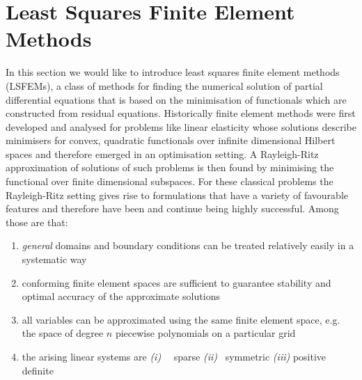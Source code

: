 \documentclass[../draft_1.tex]{subfiles}
\begin{document}
\section{Least Squares Finite Element Methods}

In this section 
we would like to introduce least squares finite element methods (LSFEMs), a class of methods for finding the numerical solution of partial differential equations that is based on the minimisation of functionals which are constructed from residual equations. Historically finite element methods were first developed and analysed for problems like linear elasticity whose solutions describe minimisers for convex, quadratic functionals over infinite dimensional Hilbert spaces and therefore emerged in an optimisation setting. A Rayleigh-Ritz approximation of solutions of such problems is then found by minimising the functional over finite dimensional subspaces. For these classical problems the Rayleigh-Ritz setting gives rise to formulations that have a variety of favourable features and therefore have been and continue being highly successful.  Among those are that:

\begin{enumerate}
	\item \textit{general} domains and boundary conditions can be treated relatively easily in a systematic way 
	\item conforming finite element spaces are sufficient to guarantee stability and optimal accuracy of the approximate solutions
	\item all variables can be approximated using the same finite element space, e.g. the space of degree $n$ piecewise polynomials on a particular grid
	\item the arising linear systems are 
	\subitem \textit{(i)}  \ \ sparse
	\subitem \textit{(ii)}  \ symmetric
	\subitem \textit{(iii)} positive definite
\end{enumerate}
\end{document}
